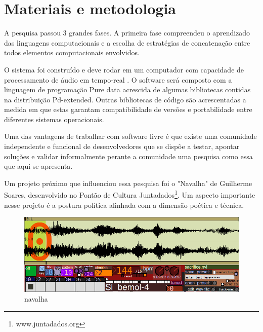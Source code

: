 \documentclass[draft]{ppgmus}
\begin{document}
\chapter{Materiais e metodologia}
\label{sec:metodologia}

A pesquisa passou 3 grandes fases.  A primeira fase
compreendeu o aprendizado das linguagens computacionais e a
escolha de estratégias de concatenação entre todos elementos
computacionais envolvidos. 

O sistema foi construído e deve rodar em um computador com capacidade de processamento
de áudio em tempo-real . O software será composto com
a linguagem de programação Pure data acrescida de algumas bibliotecas contidas
na distribuição Pd-extended. Outras bibliotecas de código são
acrescentadas a medida em que estas garantam compatibilidade de
versões e portabilidade entre diferentes sistemas operacionais.



Uma das vantagens de trabalhar com software livre é que existe uma
comunidade independente e funcional de desenvolvedores que se dispõe a
testar, apontar soluções e validar informalmente perante a comunidade
uma pesquisa como essa que aqui se apresenta.

Um projeto próximo que influenciou essa pesquisa foi o "Navalha"
de Guilherme Soares, desenvolvido no Pontão de Cultura Juntadados\footnote{www.juntadados.org}.
Um aspecto importante nesse projeto é a postura política alinhada com a dimensão
poética e técnica.

\begin{figure}
\includegraphics[scale=.6]{navalha}
\caption{navalha}
\label{navalha}
\end{figure}
\end{document}
